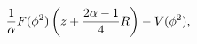\begin{equation}
\label{eq:prop1}
{1\over\alpha}F(\phi^2)\left(z+{2\alpha-1\over 4}R\right)-V(\phi^2),
\end{equation}

